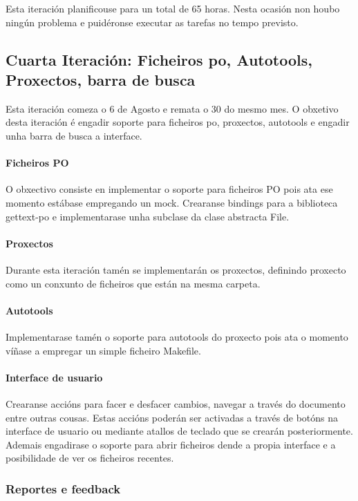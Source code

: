 Esta iteración planificouse para un total de 65 horas. Nesta ocasión non houbo ningún problema e puidéronse executar as tarefas no tempo previsto.

\subsection{Cuarta Iteración: Ficheiros po, Autotools, Proxectos, barra de busca}
Esta iteración comeza o 6 de Agosto e remata o 30 do mesmo mes. O obxetivo desta iteración é engadir soporte para ficheiros po, proxectos, autotools e engadir unha barra de busca a interface.

\paragraph{Ficheiros PO}
O obxectivo consiste en implementar o soporte para ficheiros PO pois ata ese momento estábase empregando un mock. Crearanse bindings para a biblioteca gettext-po e implementarase unha subclase da clase abstracta File.

\paragraph{Proxectos}
Durante esta iteración tamén se implementarán os proxectos, definindo proxecto como un conxunto de ficheiros que están na mesma carpeta.

\paragraph{Autotools}
Implementarase tamén o soporte para autotools do proxecto pois ata o momento víñase a empregar un simple ficheiro Makefile.

\paragraph{Interface de usuario}
Crearanse accións para facer e desfacer cambios, navegar a través do documento entre outras cousas. Estas accións poderán ser activadas a través de botóns na interface de usuario ou mediante atallos de teclado que se crearán posteriormente. Ademais engadirase o soporte para abrir ficheiros dende a propia interface e a posibilidade de ver os ficheiros recentes.

\subsubsection{Reportes e feedback}

